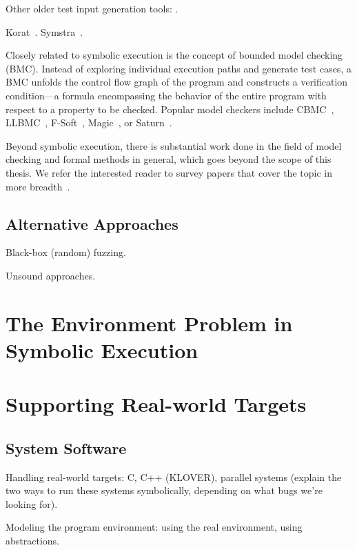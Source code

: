 Other older test input generation tools: \cite{genptrinputs}.

Korat~\cite{boyapati:korat}. Symstra~\cite{xie:symstra}.


Closely related to symbolic execution is the concept of bounded model checking (BMC).  Instead of exploring individual execution paths and generate test cases, a BMC unfolds the control flow graph of the program and constructs a verification condition---a formula encompassing the behavior of the entire program with respect to a property to be checked.  Popular model checkers include CBMC~\cite{cbmc}, LLBMC~\cite{llbmc2012}, F-Soft~\cite{f-soft}, Magic~\cite{magic}, or Saturn~\cite{saturn}.

Beyond symbolic execution, there is substantial work done in the field of model checking and formal methods in general, which goes beyond the scope of this thesis.  We refer the interested reader to survey papers that cover the topic in more breadth~\cite{jhala2009software, woodcock2009formal}.

\subsection{Alternative Approaches}

Black-box (random) fuzzing.

Unsound approaches.


\section{The Environment Problem in Symbolic Execution}



\section{Supporting Real-world Targets}
\label{sec:relwork:targets}

\subsection{System Software}

Handling real-world targets: C, C++ (KLOVER), parallel systems (explain the two ways to run these systems symbolically, depending on what bugs we're looking for).

Modeling the program environment: using the real environment, using abstractions.


